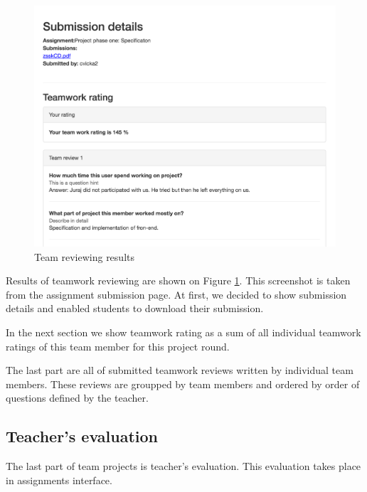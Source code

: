 \begin{figure}[h]
    \centering
    \includegraphics[width=\textwidth]{images/teamreview.png}
    \caption{Team reviewing results}
    \label{team_reviewing}
\end{figure}

Results of teamwork reviewing are shown on Figure \ref{team_reviewing}. This screenshot is taken from the assignment submission page. At first, we decided to show submission details and enabled students to download their submission.

In the next section we show teamwork rating as a sum of all individual teamwork ratings of this team member for this project round. 

The last part are all of submitted teamwork reviews written by individual team members. These reviews are groupped by team members and ordered by order of questions defined by the teacher.


\subsection{Teacher's evaluation}
The last part of team projects is teacher's evaluation. This evaluation takes place in assignments interface.

